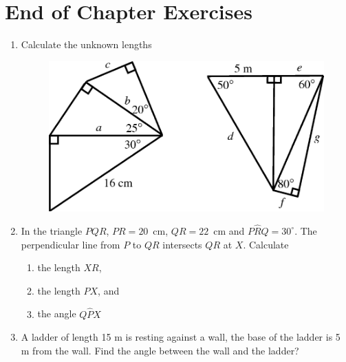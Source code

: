             \section{ End of Chapter Exercises}
            \nopagebreak
      \label{m39414*id92202}\begin{enumerate}[noitemsep, label=\textbf{\arabic*}. ] 
            \label{m39414*uid98}\item Calculate the unknown lengths
    \setcounter{subfigure}{0}
	\begin{figure}[H] %
    \begin{center}
    \label{m39414*id92222!!!underscore!!!media}\label{m39414*id92222!!!underscore!!!printimage}\includegraphics{col11306.imgs/m39414_MG10C15_041.png} %
      \vspace{2pt}
    \vspace{.1in}
    \end{center}
 \end{figure}               \label{m39414*uid99}\item In the triangle $PQR$, $PR=20$~cm, $QR=22$~cm and $P\hat{R}Q={30}^{\circ }$. The perpendicular line from $P$ to $QR$ intersects $QR$ at $X$. Calculate
\label{m39414*id92364}\begin{enumerate}[noitemsep, label=\textbf{\alph*}. ] 
            \label{m39414*uid100}\item the length $XR$,
\label{m39414*uid101}\item the length $PX$, and
\label{m39414*uid102}\item the angle $Q\hat{P}X$\end{enumerate}
                \label{m39414*uid103}\item A ladder of length 15 m is resting against a wall, the base of the ladder is 5 m from the wall. Find the angle between the wall and the ladder?\newline

\end{enumerate}

